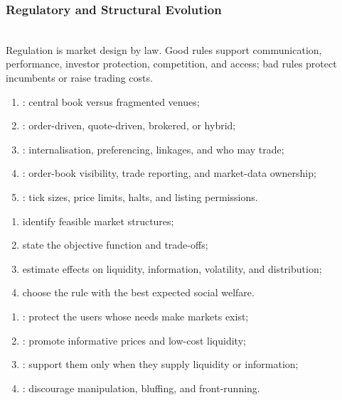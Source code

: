 \subsubsection{Regulatory and Structural Evolution}

\begin{principle} \\
Regulation is market design by law. Good rules support communication, performance, investor protection, competition, and access; bad rules protect incumbents or raise trading costs.
\end{principle}

\begin{taxonomy} 
\begin{enumerate}[label=\roman*.]
\setlength{\itemsep}{0pt}
\item {}: central book versus fragmented venues;
\item {}: order-driven, quote-driven, brokered, or hybrid;
\item {}: internalisation, preferencing, linkages, and who may trade;
\item {}: order-book visibility, trade reporting, and market-data ownership;
\item {}: tick sizes, price limits, halts, and listing permissions.
\end{enumerate}
\end{taxonomy}

\begin{process} 
\begin{enumerate}[label=\roman*.]
\setlength{\itemsep}{0pt}
\item identify feasible market structures;
\item state the objective function and trade-offs;
\item estimate effects on liquidity, information, volatility, and distribution;
\item choose the rule with the best expected social welfare.
\end{enumerate}
\end{process}

\begin{taxonomy} 
\begin{enumerate}[label=\roman*.]
\setlength{\itemsep}{0pt}
\item {}: protect the users whose needs make markets exist;
\item {}: promote informative prices and low-cost liquidity;
\item {}: support them only when they supply liquidity or information;
\item {}: discourage manipulation, bluffing, and front-running.
\end{enumerate}
\end{taxonomy}

